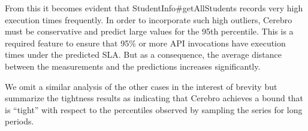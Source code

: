 

From this it becomes evident that StudentInfo\#getAll\-Students 
records very high execution times frequently. 
In order to incorporate such high outliers, Cerebro must be conservative 
and predict large values for
the 95th percentile. This is a required feature to ensure that 95\% or more 
API invocations have
execution times under the predicted SLA. But as a consequence, the average 
distance between the 
measurements and the predictions increases significantly.

We omit a similar analysis of the other cases in the interest of brevity 
but summarize the tightness results as indicating that Cerebro achieves a
bound that is ``tight'' with respect to the percentiles observed by sampling
the series for long periods. 

